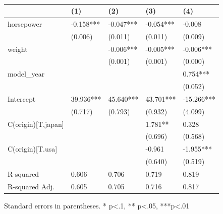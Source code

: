 \begin{table}
\caption{}
\label{}
\begin{center}
\begin{tabular}{lllll}
\hline
                   & (1)       & (2)       & (3)       & (4)         \\
\hline
horsepower         & -0.158*** & -0.047*** & -0.054*** & -0.008      \\
                   & (0.006)   & (0.011)   & (0.011)   & (0.009)     \\
weight             &           & -0.006*** & -0.005*** & -0.006***   \\
                   &           & (0.001)   & (0.001)   & (0.000)     \\
model\_year        &           &           &           & 0.754***    \\
                   &           &           &           & (0.052)     \\
Intercept          & 39.936*** & 45.640*** & 43.701*** & -15.266***  \\
                   & (0.717)   & (0.793)   & (0.932)   & (4.099)     \\
C(origin)[T.japan] &           &           & 1.781**   & 0.328       \\
                   &           &           & (0.696)   & (0.568)     \\
C(origin)[T.usa]   &           &           & -0.961    & -1.955***   \\
                   &           &           & (0.640)   & (0.519)     \\
R-squared          & 0.606     & 0.706     & 0.719     & 0.819       \\
R-squared Adj.     & 0.605     & 0.705     & 0.716     & 0.817       \\
\hline
\end{tabular}
\end{center}
\end{table}
\bigskip
Standard errors in parentheses. \newline 
* p<.1, ** p<.05, ***p<.01